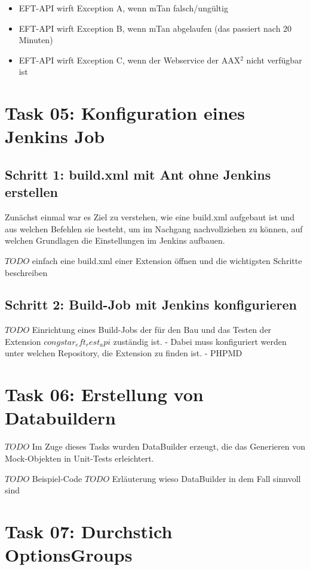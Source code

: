 \documentclass[11pt,a4paper]{article} %
\begin{document}
\begin{itemize}
	\item EFT-API wirft Exception A, wenn mTan falsch/ungültig
	\item EFT-API wirft Exception B, wenn mTan abgelaufen (das passiert nach 20 Minuten)
	\item EFT-API wirft Exception C, wenn der Webservice der AAX$^2$ nicht verfügbar ist
\end{itemize}




\section{Task 05: Konfiguration eines Jenkins Job}

\subsection{Schritt 1: build.xml mit Ant ohne Jenkins erstellen}
Zunächst einmal war es Ziel zu verstehen, wie eine build.xml aufgebaut ist
und aus welchen Befehlen sie besteht, um im Nachgang nachvollziehen zu können, auf welchen
Grundlagen die Einstellungen im Jenkins aufbauen.

$TODO$ einfach eine build.xml einer Extension öffnen und die wichtigsten Schritte beschreiben

\subsection{Schritt 2: Build-Job mit Jenkins konfigurieren}

$TODO$ Einrichtung eines Build-Jobs der für den Bau und das Testen
der Extension $congstar_eft_rest_api$ zuständig ist.
- Dabei muss konfiguriert werden unter welchen Repository, die Extension zu finden ist.
- PHPMD




\section{Task 06: Erstellung von Databuildern}

$TODO$ Im Zuge dieses Tasks wurden DataBuilder erzeugt, die das Generieren von Mock-Objekten in Unit-Tests erleichtert.

$TODO$ Beispiel-Code 
$TODO$ Erläuterung wieso DataBuilder in dem Fall sinnvoll sind




\section{Task 07: Durchstich OptionsGroups}
\end{document}

